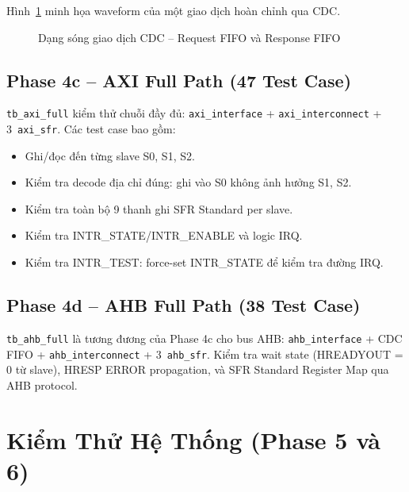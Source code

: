 Hình~\ref{fig:cdc-waveform} minh họa waveform của một giao dịch hoàn chỉnh qua CDC.

\begin{figure}[htp]
\centering
{}
\caption{Dạng sóng giao dịch CDC -- Request FIFO và Response FIFO}
\label{fig:cdc-waveform}
\end{figure}

\subsection{Phase 4c -- AXI Full Path (47 Test Case)}

\texttt{tb\_axi\_full} kiểm thử chuỗi đầy đủ: \texttt{axi\_interface} + \texttt{axi\_interconnect} + 3~\texttt{axi\_sfr}. Các test case bao gồm:
\begin{itemize}
    \item Ghi/đọc đến từng slave S0, S1, S2.
    \item Kiểm tra decode địa chỉ đúng: ghi vào S0 không ảnh hưởng S1, S2.
    \item Kiểm tra toàn bộ 9 thanh ghi SFR Standard per slave.
    \item Kiểm tra INTR\_STATE/INTR\_ENABLE và logic IRQ.
    \item Kiểm tra INTR\_TEST: force-set INTR\_STATE để kiểm tra đường IRQ.
\end{itemize}

\subsection{Phase 4d -- AHB Full Path (38 Test Case)}

\texttt{tb\_ahb\_full} là tương đương của Phase 4c cho bus AHB: \texttt{ahb\_interface} + CDC FIFO + \texttt{ahb\_interconnect} + 3~\texttt{ahb\_sfr}. Kiểm tra wait state (HREADYOUT = 0 từ slave), HRESP ERROR propagation, và SFR Standard Register Map qua AHB protocol.

\section{Kiểm Thử Hệ Thống (Phase 5 và 6)}

